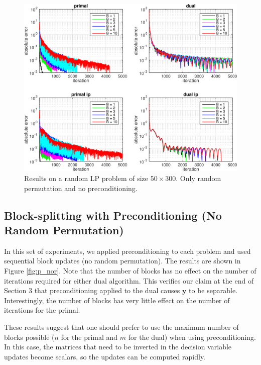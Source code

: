 \documentclass{article}
\begin{document}
\begin{figure}[h]
	\includegraphics[width=\textwidth]{../figures/noprecond_rndperm.png}
	\caption{Results on a random LP problem of size $50 \times 300$. Only random permutation and no preconditioning.}
	\label{fig:nop_r}
\end{figure}

\subsection*{Block-splitting with Preconditioning (No Random Permutation)}
In this set of experiments, we applied preconditioning to each problem and used sequential block updates (no random permutation). The results are shown in Figure \ref{fig:p_nor}. Note that the number of blocks has no effect on the number of iterations required for either dual algorithm. This verifies our claim at the end of Section 3 that preconditioning applied to the dual causes $\mathbf{y}$ to be separable. Interestingly, the number of blocks has very little effect on the number of iterations for the primal. 

These results suggest that one should prefer to use the maximum number of blocks possible ($n$ for the primal and $m$ for the dual) when using preconditioning. In this case, the matrices that need to be inverted in the decision variable updates become scalars, so the updates can be computed rapidly.
\end{document}
